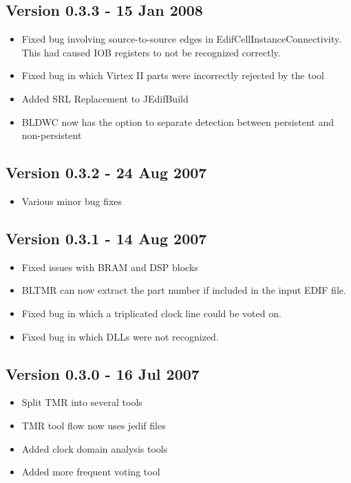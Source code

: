 \documentclass[english]{article}
\begin{document}
\subsection*{Version 0.3.3 - 15 Jan 2008}
\begin{itemize}
\item Fixed bug involving source-to-source edges in
EdifCellInstanceConnectivity. This had caused IOB registers to not be recognized
correctly.
\item Fixed bug in which Virtex II parts were incorrectly rejected by the tool
\item Added SRL Replacement to JEdifBuild
\item BLDWC now has the option to separate detection between persistent and
non-persistent
\end{itemize}

\subsection*{Version 0.3.2 - 24 Aug 2007}
\begin{itemize}
\item Various minor bug fixes
\end{itemize}

\subsection*{Version 0.3.1 - 14 Aug 2007}
\begin{itemize}
\item Fixed issues with BRAM and DSP blocks
\item BLTMR can now extract the part number if included in the input EDIF file.
\item Fixed bug in which a triplicated clock line could be voted on.
\item Fixed bug in which DLLs were not recognized.
\end{itemize}

\subsection*{Version 0.3.0 - 16 Jul 2007}
\begin{itemize}
\item Split TMR into several tools
\item TMR tool flow now uses jedif files
\item Added clock domain analysis tools
\item Added more frequent voting tool
\end{itemize}
\end{document}
